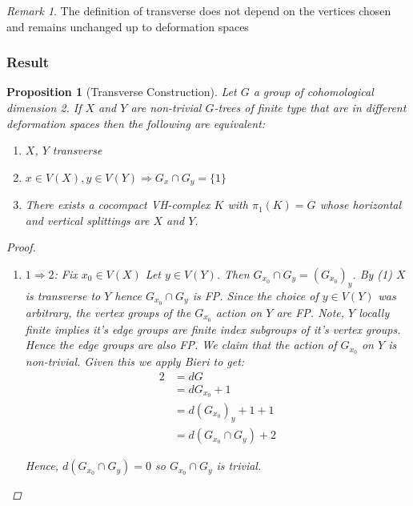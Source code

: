 \documentclass{article}
\theoremstyle{mystyle}
\newtheorem{pro}{Proposition}
\theoremstyle{remark}
\newtheorem{rmk}{Remark}[section]
\begin{document}
\begin{rmk}
    The definition of transverse does not depend on the vertices chosen and remains unchanged up to deformation spaces
\end{rmk}

\subsubsection{Result}

\begin{pro}
    [Transverse Construction]
    \label{pro:transverseconstruction} 
 Let $G$ a group of cohomological dimension 2. If $X$ and $Y$ are non-trivial $G$-trees of finite type that are in different deformation spaces then the following are equivalent:
\begin{enumerate}
    \item $X$, $Y$ transverse
    \item $x \in V(X), y\in V(Y)\Longrightarrow G_x\cap G_y = \{1\}$
    \item There exists a cocompact VH-complex $K$ with $\pi_1(K) = G$ whose horizontal and vertical splittings are $X$ and $Y$.
\end{enumerate}
\begin{proof}
\begin{enumerate}
    \item $1\Rightarrow 2$: Fix $x_0 \in V(X)$ Let $y\in V(Y)$. Then $G_{x_0} \cap G_y = (G_{x_0})_y$. By (1) $X$ is transverse to $Y$ hence $G_{x_0}\cap G_y$ is FP. Since the choice of $y\in V(Y)$ was arbitrary, the vertex groups of the $G_{x_0}$ action on $Y$ are FP. Note, $Y$ locally finite implies it's edge groups are finite index subgroups of it's vertex groups. Hence the edge groups are also FP. We claim that the action of $G_{x_0}$ on $Y$ is non-trivial. Given this we apply Bieri to get:
    \begin{align*}
        2 &= dG\\
          &= dG_{x_0}+1\\
          &= d( G_{x_0} )_y+1+1\\
          &= d(G_{x_0}\cap G_y)+2
    \end{align*}
    
    Hence, $d(G_{x_0}\cap G_y)=0$ so $G_{x_0}\cap G_y$ is trivial.
    

\end{enumerate}
\end{proof}
\end{pro}
\end{document}
